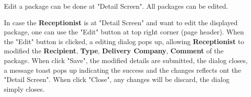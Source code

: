 Edit a package can be done at "Detail Screen". All packages can be edited.
\bigskip

In case the \textbf{Receptionist} is at "Detail Screen" and want to edit the displayed package, one can use the "Edit" button at top right corner (page header). 
When the "Edit" button is clicked, a editing dialog pops up, allowing \textbf{Receptionist} to modified the \textbf{Recipient}, \textbf{Type}, \textbf{Delivery Company}, \textbf{Comment} of the package. 
When click "Save", the modified details are submitted, the dialog closes, a message toast pops up indicating the success and the changes reflects ont the "Detail Screen". When click "Close", any changes will be discard, the dialog simply closes.

\begin{figure}[H]
	\centering
    \vspace{5pt}
    \hspace{5pt}

\end{figure}
